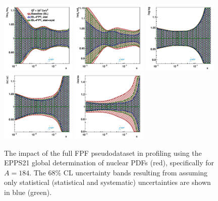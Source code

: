 \begin{figure}[t]
\centering
\includegraphics[width=0.32\textwidth]{plots/nuclear_fasernu2/FPF/fred05fcorr05_FPF_q2_10000_pdf_uv_ratio.pdf}
\includegraphics[width=0.32\textwidth]{plots/nuclear_fasernu2/FPF/fred05fcorr05_FPF_q2_10000_pdf_dv_ratio.pdf}
\includegraphics[width=0.32\textwidth]{plots/nuclear_fasernu2/FPF/fred05fcorr05_FPF_q2_10000_pdf_g_ratio.pdf}\\
\includegraphics[width=0.32\textwidth]{plots/nuclear_fasernu2/FPF/fred05fcorr05_FPF_q2_10000_pdf_Sea_ratio.pdf}
\includegraphics[width=0.32\textwidth]{plots/nuclear_fasernu2/FPF/fred05fcorr05_FPF_q2_10000_pdf_s_ratio.pdf}
\caption{The impact of the full FPF pseudodataset in profiling using the EPPS21 global determination of nuclear PDFs (red), specifically for $A=184$. The 68\% CL uncertainty bands resulting from assuming only statistical (statistical and systematic) uncertainties are shown in blue (green).
}
\label{fig:profiling_FPF_nuclear}
\end{figure}
